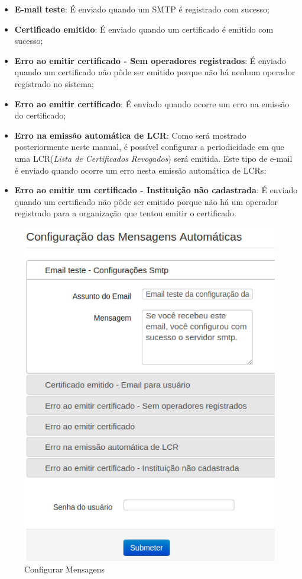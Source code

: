 \begin{itemize}
	\item \textbf{E-mail teste}: É enviado quando um SMTP é registrado com sucesso;
	\item \textbf{Certificado emitido}: É enviado quando um certificado é emitido com sucesso;
	\item \textbf{Erro ao emitir certificado - Sem operadores registrados}: É enviado quando um certificado não pôde ser emitido porque não há nenhum operador registrado no sistema;
	\item \textbf{Erro ao emitir certificado}: É enviado quando ocorre um erro na emissão do certificado;
	\item \textbf{Erro na emissão automática de LCR}: Como será mostrado posteriormente neste manual, é possível configurar a periodicidade em que uma LCR(\textit{Lista de Certificados Revogados}) será emitida. Este tipo de e-mail é enviado quando ocorre um erro nesta emissão automática de LCRs;
	\item \textbf{Erro ao emitir um certificado - Instituição não cadastrada}: É enviado quando um certificado não pôde ser emitido porque não há um operador registrado para a organização que tentou emitir o certificado.
\end{itemize}

\begin{figure}[ht]
     \centering
     \includegraphics[scale=0.6]{images/msgsmtp.png}
     \caption{Configurar Mensagens}
     \label{fig:msgsmtp}
\end{figure}

